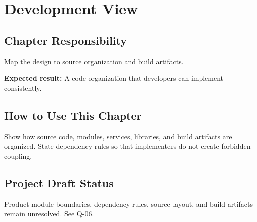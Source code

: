 \chapter{Development View}
\section{Chapter Responsibility}
\label{Section:DevelopmentViewResponsibility}
Map the design to source organization and build artifacts.

\noindent\textbf{Expected result:} A code organization that developers can implement consistently.

\section{How to Use This Chapter}
Show how source code, modules, services, libraries, and build artifacts are organized. State dependency rules so that implementers do not create forbidden coupling.
\section{Project Draft Status}
Product module boundaries, dependency rules, source layout, and build artifacts remain unresolved. See \hyperref[Question:Q-06]{Q-06}.
